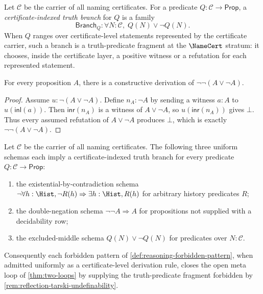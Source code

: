 \begin{definition}
\label{def:reasoning-certificate-indexed-truth-branch}
Let $\mathcal C$ be the carrier of all naming certificates. For a predicate $Q:\mathcal C\to\mathsf{Prop}$, a \emph{certificate-indexed truth branch} for $Q$ is a family
$$
\mathsf{Branch}_Q:\forall N:\mathcal C,\; Q(N)\vee\neg Q(N).
$$
When $Q$ ranges over certificate-level statements represented by the certificate carrier, such a branch is a truth-predicate fragment at the $\NameCert$ stratum: it chooses, inside the certificate layer, a positive witness or a refutation for each represented statement.
\end{definition}

\begin{lemma}
\label{lem:reasoning-excluded-middle-branch-double-negated}
For every proposition $A$, there is a constructive derivation of $\neg\neg(A\vee\neg A)$.
\end{lemma}

\begin{proof}
Assume $u:\neg(A\vee\neg A)$. Define $n_A:\neg A$ by sending a witness $a:A$ to $u(\mathsf{inl}(a))$. Then $\mathsf{inr}(n_A)$ is a witness of $A\vee\neg A$, so $u(\mathsf{inr}(n_A))$ gives $\bot$. Thus every assumed refutation of $A\vee\neg A$ produces $\bot$, which is exactly $\neg\neg(A\vee\neg A)$.
\end{proof}

\begin{theorem}
\label{thm:reasoning-forbidden-schemas-produce-certificate-truth-branches}
Let $\mathcal C$ be the carrier of all naming certificates. The following three uniform schemas each imply a certificate-indexed truth branch for every predicate $Q:\mathcal C\to\mathsf{Prop}$:
\begin{enumerate}
\item the existential-by-contradiction schema $\neg\forall h:\Hist,\neg R(h)\Rightarrow\exists h:\Hist,R(h)$ for arbitrary history predicates $R$;
\item the double-negation schema $\neg\neg A\Rightarrow A$ for propositions not supplied with a decidability row;
\item the excluded-middle schema $Q(N)\vee\neg Q(N)$ for predicates over $N:\mathcal C$.
\end{enumerate}
Consequently each forbidden pattern of \autoref{def:reasoning-forbidden-pattern}, when admitted uniformly as a certificate-level derivation rule, closes the open meta loop of \autoref{thm:two-loops} by supplying the truth-predicate fragment forbidden by \autoref{rem:reflection-tarski-undefinability}.
\end{theorem}

